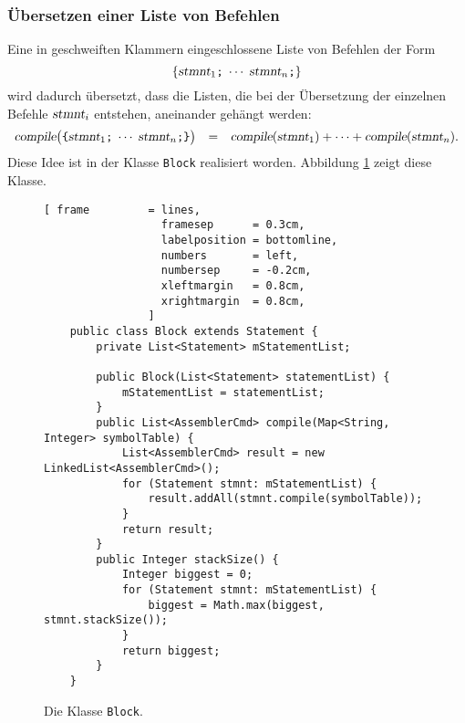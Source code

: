 \subsubsection{\"Ubersetzen einer Liste von Befehlen}
Eine in geschweiften Klammern eingeschlossene Liste von Befehlen der Form
\[ \{ \textsl{stmnt}_1\texttt{;}\; \cdots\; \textsl{stmnt}_n\texttt{;} \} \]
wird dadurch \"ubersetzt, dass die Listen, die bei der \"Ubersetzung der einzelnen Befehle
$\textsl{stmnt}_i$ entstehen, aneinander geh\"angt werden:
\[
   \begin{array}[t]{lcl}
   \textsl{compile}\bigl(\texttt{\{} \textsl{stmnt}_1\texttt{;}\; \cdots\; \textsl{stmnt}_n\texttt{;} \texttt{\}}\bigr) & = & 
         \textsl{compile}(\textsl{stmnt}_1) + \cdots + \textsl{compile}(\textsl{stmnt}_n).
   \end{array}
\]
Diese Idee ist in der Klasse \texttt{Block} realisiert worden. Abbildung
\ref{fig:Statement:Block.java} zeigt diese Klasse.

\begin{figure}[!ht]
\centering
\begin{Verbatim}[ frame         = lines, 
                  framesep      = 0.3cm, 
                  labelposition = bottomline,
                  numbers       = left,
                  numbersep     = -0.2cm,
                  xleftmargin   = 0.8cm,
                  xrightmargin  = 0.8cm,
                ]
    public class Block extends Statement {
        private List<Statement> mStatementList;
    
        public Block(List<Statement> statementList) {
            mStatementList = statementList;
        }
        public List<AssemblerCmd> compile(Map<String, Integer> symbolTable) {
            List<AssemblerCmd> result = new LinkedList<AssemblerCmd>();
            for (Statement stmnt: mStatementList) {
                result.addAll(stmnt.compile(symbolTable));
            }
            return result;
        }
        public Integer stackSize() {
            Integer biggest = 0;
            for (Statement stmnt: mStatementList) {
                biggest = Math.max(biggest, stmnt.stackSize());
            }
            return biggest;
        }
    }
\end{Verbatim}
\vspace*{-0.3cm}
\caption{Die Klasse \texttt{Block}.}
\label{fig:Statement:Block.java}
\end{figure}

